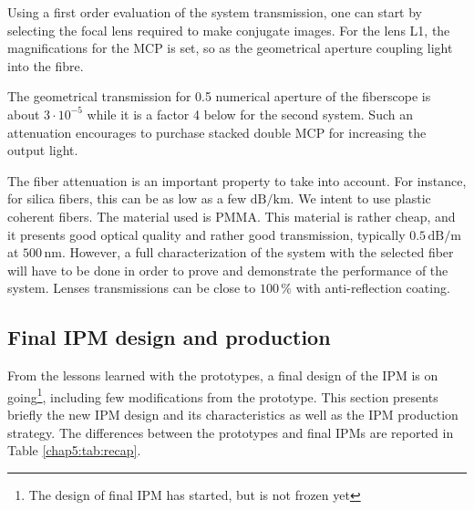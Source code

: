 

Using a first order evaluation of the system transmission, one can start by selecting the focal lens required to make conjugate images. For the lens L1, the magnifications for the MCP is set, so as the geometrical aperture coupling light into the fibre.

The geometrical transmission for 0.5 numerical aperture of the fiberscope is about $3 \cdot 10^{-5}$ while it is a factor 4 below for the second system. Such an attenuation encourages to purchase stacked double MCP for increasing the output light.

The fiber attenuation is an important property to take into account. For instance, for silica fibers, this can be as low as a few $\mathrm{dB/km}$. We intent to use plastic coherent fibers. The material used is PMMA. This material is rather cheap, and it presents good optical quality and rather good transmission, typically $0.5\,\mathrm{dB/m}$ at $500\,\mathrm{nm}$. However, a full characterization of the system with the selected fiber will have to be done in order to prove and demonstrate the performance of the system. Lenses transmissions can be close to $100\,\mathrm{\%}$ with anti-reflection coating.

\subsection*{Final IPM design and production}


From the lessons learned with the prototypes, a final design of the IPM is on going\footnote{The design of final IPM has started, but is not frozen yet}, including few modifications from the prototype. This section presents briefly the new IPM design and its characteristics as well as the IPM production strategy. The differences between the prototypes and final IPMs are reported in Table \ref{chap5:tab:recap}. 

